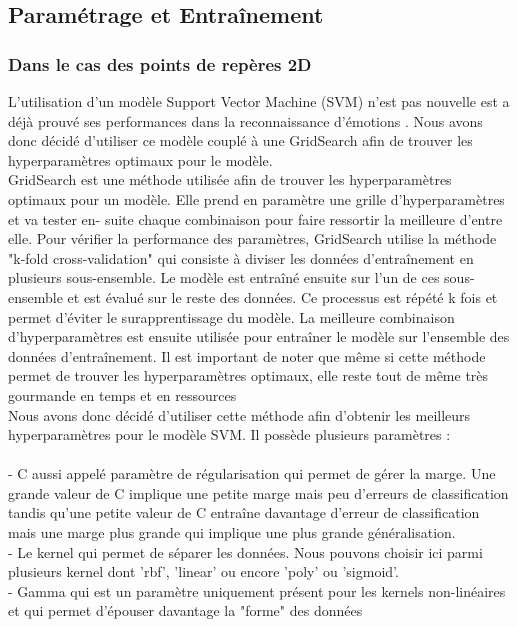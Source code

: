 \documentclass{rapport}
\begin{document}
\subsection{Paramétrage et Entraînement}

\subsubsection{Dans le cas des points de repères 2D}
L'utilisation d'un modèle Support Vector Machine (SVM) n'est pas nouvelle est a déjà prouvé ses performances dans la reconnaissance
d'émotions \cite{kalapalaFacialExpressionRecognition2020}. Nous avons donc décidé d'utiliser ce modèle couplé à une GridSearch
afin de trouver les hyperparamètres optimaux pour le modèle.\\

GridSearch est une méthode utilisée afin de trouver les hyperparamètres optimaux
pour un modèle. Elle prend en paramètre une grille d'hyperparamètres et va tester en-
suite chaque combinaison pour faire ressortir la meilleure d'entre elle. Pour vérifier la
performance des paramètres, GridSearch utilise la méthode "k-fold cross-validation" qui
consiste à diviser les données d'entraînement en plusieurs sous-ensemble. Le modèle est
entraîné ensuite sur l'un de ces sous-ensemble et est évalué sur le reste des données. Ce
processus est répété k fois et permet d'éviter le surapprentissage du modèle. La meilleure
combinaison d'hyperparamètres est ensuite utilisée pour entraîner le modèle sur l'ensemble
des données d'entraînement. Il est important de noter que même si cette méthode permet
de trouver les hyperparamètres optimaux, elle reste tout de même très gourmande en
temps et en ressources\\

Nous avons donc décidé d'utiliser cette méthode afin d'obtenir les meilleurs hyperparamètres pour le modèle SVM. Il possède plusieurs paramètres :\\
\\- C aussi appelé paramètre de régularisation qui permet de gérer la marge. Une grande valeur de C implique une petite marge mais peu d'erreurs de classification
tandis qu'une petite valeur de C entraîne davantage d'erreur de classification mais une marge plus grande qui implique une plus grande généralisation.\\
- Le kernel qui permet de séparer les données. Nous pouvons choisir ici parmi plusieurs kernel dont 'rbf', 'linear' ou encore
'poly' ou 'sigmoid'.\\
- Gamma qui est un paramètre uniquement présent pour les kernels non-linéaires et qui permet d'épouser davantage la "forme" des données
\end{document}
